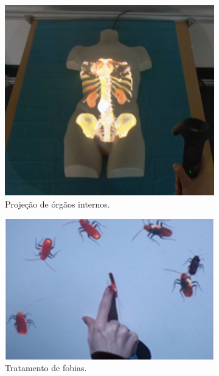 \begin{figure}
    \centering
    \begin{subfigure}{.33\textwidth}
        \centering
        \includegraphics[width=.9\linewidth,fbox]{figs/bornemann.png}
        \caption{Projeção de órgãos internos.}
        \label{fig_bornemann}
    \end{subfigure}%
    \begin{subfigure}{.33\textwidth}
        \centering
        \includegraphics[width=.9\linewidth,fbox]{figs/wrzesien.png}
        \caption{Tratamento de fobias.}
        \label{fig_wrzesien}
    \end{subfigure}%
    \begin{subfigure}{.33\textwidth}

\end{subfigure}
\end{figure}
